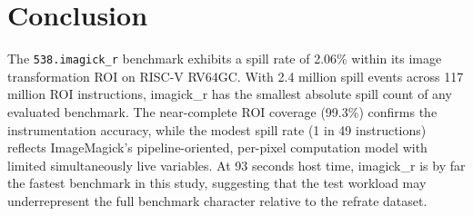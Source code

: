 \documentclass[conference]{IEEEtran}
\begin{document}
\section{Conclusion}

The \texttt{538.imagick\_r} benchmark exhibits a spill rate of 2.06\%
within its image transformation ROI on RISC-V RV64GC. With 2.4 million
spill events across 117 million ROI instructions, imagick\_r has the
smallest absolute spill count of any evaluated benchmark. The
near-complete ROI coverage (99.3\%) confirms the instrumentation
accuracy, while the modest spill rate (1 in 49 instructions) reflects
ImageMagick's pipeline-oriented, per-pixel computation model with
limited simultaneously live variables. At 93 seconds host time,
imagick\_r is by far the fastest benchmark in this study, suggesting
that the test workload may underrepresent the full benchmark character
relative to the refrate dataset.
\end{document}
